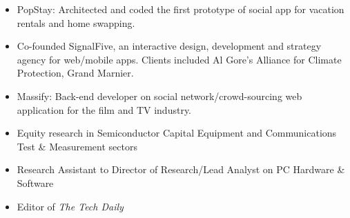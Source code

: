 \documentclass[a4paper,12pt]{memoir} %
\begin{document}
\clearpage %
\userinformation %
\framebreak %

\begin{itemize}
	\item PopStay: Architected and coded the first prototype of social app for vacation rentals and home swapping.
	\item Co-founded SignalFive, an interactive design, development and strategy agency for web/mobile apps. Clients included Al Gore's Alliance for Climate Protection, Grand Marnier. 
	\item Massify: Back-end developer on social network/crowd-sourcing web application for the film and TV industry.
\end{itemize}
\Sep %



\begin{itemize}
	\item Equity research in Semiconductor Capital Equipment and Communications Test \& Measurement sectors
\end{itemize}
\Sep %

\begin{itemize}
	\item Research Assistant to Director of Research/Lead Analyst on PC Hardware \& Software 
	\item Editor of \textit{The Tech Daily}
\end{itemize}

\Sep %



\end{document}
